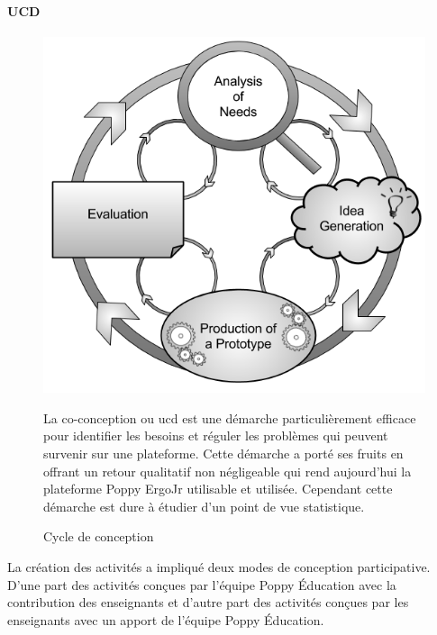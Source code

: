         \paragraph{UCD} \label{sec:ucd}
        \strut
            \begin{figure}[!h]
            \begin{minipage}{0.475\linewidth}
                \centering
                \includegraphics[width=\linewidth]{Figures/Cycle_conception.png}
                \caption{Cycle de conception}\label{fig:Cycle_conception}
            \end{minipage}
            \hfill
            \begin{minipage}{0.5\linewidth}
            \myDefautStyle
                La co-conception ou \glsdesc{ucd} est une démarche particulièrement efficace pour identifier les besoins et réguler les problèmes qui peuvent survenir sur une plateforme. Cette démarche a porté ses fruits en offrant un retour qualitatif non négligeable qui rend aujourd'hui la plateforme Poppy ErgoJr utilisable et utilisée. Cependant cette démarche est dure à étudier d'un point de vue statistique. 
            \end{minipage}
            \end{figure}\par%
            La création des activités a impliqué deux modes de conception participative. D'une part des activités conçues par l'équipe Poppy Éducation avec la contribution des enseignants et d'autre part des activités conçues par les enseignants avec un apport de l'équipe Poppy Éducation. 
